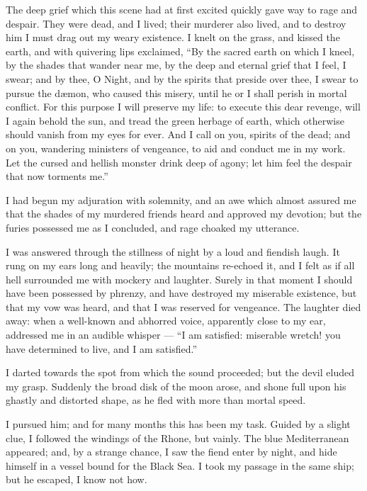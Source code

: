 The deep grief which this scene had
at first excited quickly gave way to
rage and despair. They were dead,
and I lived; their murderer also lived,
and to destroy him I must drag out my
weary existence. I knelt on the grass,
and kissed the earth, and with quivering
lips exclaimed, ``By the sacred
earth on which I kneel, by the shades
that wander near me, by the deep and
eternal grief that I feel, I swear; and
by thee, O Night, and by the spirits
that preside over thee, I swear to pursue
the dæmon, who caused this misery,
until he or I shall perish in mortal conflict.
For this purpose I will preserve
my life: to execute this dear revenge,
will I again behold the sun, and tread
the green herbage of earth, which
otherwise should vanish from my eyes
for ever. And I call on you, spirits of
the dead; and on you, wandering ministers
of vengeance, to aid and
conduct me in my work. Let the cursed
and hellish monster drink deep of
agony; let him feel the despair that
now torments me.''

I had begun my adjuration with
solemnity, and an awe which almost
assured me that the shades of my
murdered friends heard and approved
my devotion; but the furies possessed
me as I concluded, and rage choaked
my utterance.

I was answered through the stillness
of night by a loud and fiendish laugh.
It rung on my ears long and heavily;
the mountains re-echoed it, and I felt
as if all hell surrounded me with
mockery and laughter. Surely in that
moment I should have been possessed
by phrenzy, and have destroyed my
miserable existence, but that my vow
was heard, and that I was reserved for
vengeance. The laughter died away:
when a well-known and abhorred voice,
apparently close to my ear, addressed
me in an audible whisper --- ``I am
satisfied: miserable wretch! you have
determined to live, and I am satisfied.''

I darted towards the spot from which
the sound proceeded; but the devil
eluded my grasp. Suddenly the broad
disk of the moon arose, and shone full
upon his ghastly and distorted shape,
as he fled with more than mortal
speed.

I pursued him; and for many months
this has been my task. Guided by a
slight clue, I followed the windings of
the Rhone, but vainly. The blue
Mediterranean appeared; and, by a
strange chance, I saw the fiend enter
by night, and hide himself in a vessel
bound for the Black Sea. I took my
passage in the same ship; but he escaped,
I know not how.

